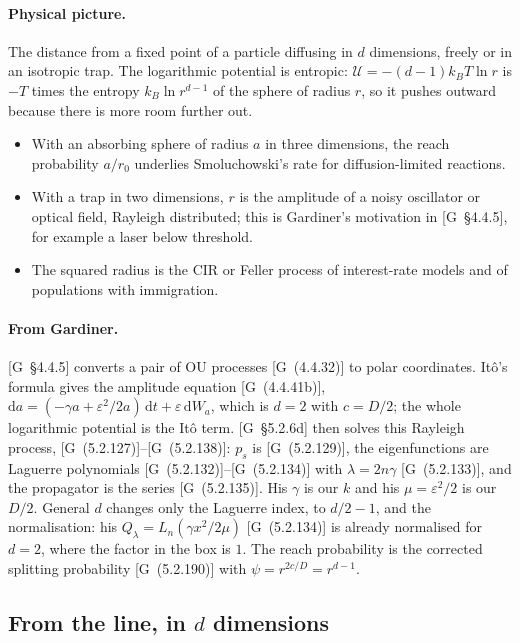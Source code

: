 \documentclass[11pt]{article}
\numberwithin{equation}{section}
\newcommand{\dd}{\mathrm{d}}
\newcommand{\G}[1]{[G~(#1)]}
\newcommand{\Gs}[1]{[G~\S#1]}
\begin{document}
\paragraph{Physical picture.} The distance from a fixed point of a particle diffusing in $d$ dimensions, freely or
in an isotropic trap. The logarithmic potential is entropic: $\mathcal U=-(d-1)k_BT\ln r$ is $-T$ times the
entropy $k_B\ln r^{d-1}$ of the sphere of radius $r$, so it pushes outward because there is more room further out.
\begin{itemize}
  \item With an absorbing sphere of radius $a$ in three dimensions, the reach probability $a/r_0$ underlies
        Smoluchowski's rate for diffusion-limited reactions.
  \item With a trap in two dimensions, $r$ is the amplitude of a noisy oscillator or optical field, Rayleigh
        distributed; this is Gardiner's motivation in \Gs{4.4.5}, for example a laser below threshold.
  \item The squared radius is the CIR or Feller process of interest-rate models and of populations with
        immigration.
\end{itemize}

\paragraph{From Gardiner.} \Gs{4.4.5} converts a pair of OU processes \G{4.4.32} to polar coordinates. Itô's
formula gives the amplitude equation \G{4.4.41b}, $\dd a=(-\gamma a+\varepsilon^2/2a)\,\dd t+\varepsilon\,\dd W_a$,
which is $d=2$ with $c=D/2$; the whole logarithmic potential is the Itô term. \Gs{5.2.6d} then solves this
Rayleigh process, \G{5.2.127}--\G{5.2.138}: $p_s$ is \G{5.2.129}, the eigenfunctions are Laguerre polynomials
\G{5.2.132}--\G{5.2.134} with $\lambda=2n\gamma$ \G{5.2.133}, and the propagator is the series \G{5.2.135}. His
$\gamma$ is our $k$ and his $\mu=\varepsilon^2/2$ is our $D/2$. General $d$ changes only the Laguerre index, to
$d/2-1$, and the normalisation: his $Q_\lambda=L_n(\gamma x^2/2\mu)$ \G{5.2.134} is already normalised for $d=2$, where
the factor in the box is $1$. The reach probability is the corrected splitting probability \G{5.2.190} with
$\psi=r^{2c/D}=r^{d-1}$.

\subsection{From the line, in \texorpdfstring{$d$}{d} dimensions}
\end{document}

